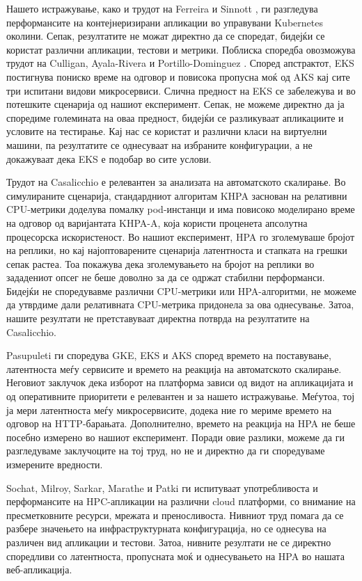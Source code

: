 \documentclass{article}
\begin{document}
Нашето истражување, како и трудот на Ferreira и Sinnott \cite{ferreira2019}, ги разгледува перформансите на контејнеризирани апликации во управувани Kubernetes околини. Сепак, резултатите не можат директно да се споредат, бидејќи се користат различни апликации, тестови и метрики. Поблиска споредба овозможува трудот на Culligan, Ayala-Rivera и Portillo-Dominguez \cite{culligan2026}. Според апстрактот, EKS постигнува пониско време на одговор и повисока пропусна моќ од AKS кај сите три испитани видови микросервиси. Слична предност на EKS се забележува и во потешките сценарија од нашиот експеримент. Сепак, не можеме директно да ја споредиме големината на оваа предност, бидејќи се разликуваат апликациите и условите на тестирање. Кај нас се користат и различни класи на виртуелни машини, па резултатите се однесуваат на избраните конфигурации, а не докажуваат дека EKS е подобар во сите услови.

Трудот на Casalicchio \cite{casalicchio2019} е релевантен за анализата на автоматското скалирање. Во симулираните сценарија, стандардниот алгоритам KHPA заснован на релативни CPU-метрики доделува помалку pod-инстанци и има повисоко моделирано време на одговор од варијантата KHPA-A, која користи проценета апсолутна процесорска искористеност. Во нашиот експеримент, HPA го зголемуваше бројот на реплики, но кај најоптоварените сценарија латентноста и стапката на грешки сепак растеа. Тоа покажува дека зголемувањето на бројот на реплики во зададениот опсег не беше доволно за да се одржат стабилни перформанси. Бидејќи не споредувавме различни CPU-метрики или HPA-алгоритми, не можеме да утврдиме дали релативната CPU-метрика придонела за ова однесување. Затоа, нашите резултати не претставуваат директна потврда на резултатите на Casalicchio.

Pasupuleti \cite{multicloud2025} ги споредува GKE, EKS и AKS според времето на поставување, латентноста меѓу сервисите и времето на реакција на автоматското скалирање. Неговиот заклучок дека изборот на платформа зависи од видот на апликацијата и од оперативните приоритети е релевантен и за нашето истражување. Меѓутоа, тој ја мери латентноста меѓу микросервисите, додека ние го мериме времето на одговор на HTTP-барањата. Дополнително, времето на реакција на HPA не беше посебно измерено во нашиот експеримент. Поради овие разлики, можеме да ги разгледуваме заклучоците на тој труд, но не и директно да ги споредуваме измерените вредности.

Sochat, Milroy, Sarkar, Marathe и Patki \cite{sochat2025} ги испитуваат употребливоста и перформансите на HPC-апликации на различни cloud платформи, со внимание на пресметковните ресурси, мрежата и преносливоста. Нивниот труд помага да се разбере значењето на инфраструктурната конфигурација, но се однесува на различен вид апликации и тестови. Затоа, нивните резултати не се директно споредливи со латентноста, пропусната моќ и однесувањето на HPA во нашата веб-апликација.
\end{document}
